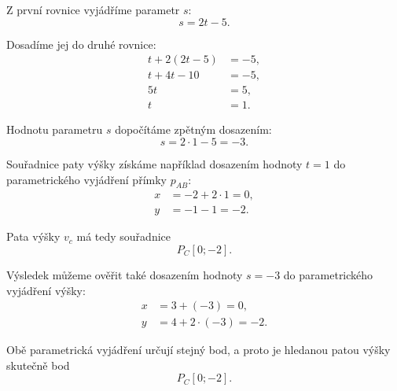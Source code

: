 \begin{example}
    Z první rovnice vyjádříme parametr $s$:
    \[
        s=2t-5.
    \]

    Dosadíme jej do druhé rovnice:
    \begin{align*}
        t+2(2t-5) &= -5,\\
        t+4t-10 &= -5,\\
        5t &= 5,\\
        t &= 1.
    \end{align*}

    Hodnotu parametru $s$ dopočítáme zpětným dosazením:
    \[
        s=2\cdot1-5=-3.
    \]

    Souřadnice paty výšky získáme například dosazením hodnoty $t=1$
    do parametrického vyjádření přímky $p_{AB}$:
    \begin{align*}
        x &= -2+2\cdot1=0,\\
        y &= -1-1=-2.
    \end{align*}

    Pata výšky $v_c$ má tedy souřadnice
    \[
        P_C[0;-2].
    \]

    Výsledek můžeme ověřit také dosazením hodnoty $s=-3$ do
    parametrického vyjádření výšky:
    \begin{align*}
        x &= 3+(-3)=0,\\
        y &= 4+2\cdot(-3)=-2.
    \end{align*}

    Obě parametrická vyjádření určují stejný bod, a proto je hledanou
    patou výšky skutečně bod
    \[
        P_C[0;-2].
    \]
\end{example}